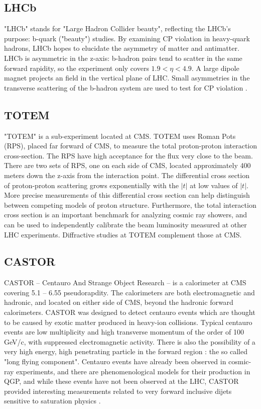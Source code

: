 \subsection{LHCb}

"LHCb" stands for "Large Hadron Collider beauty", reflecting the LHCb's purpose: b-quark ("beauty") studies. By examining CP violation in heavy-quark hadrons, LHCb hopes to elucidate the asymmetry of matter and antimatter. LHCb is asymmetric in the z-axis: b-hadron pairs tend to scatter in the same forward rapidity, so the experiment only covers $1.9<\eta<4.9$. A large dipole magnet projects an field in the vertical plane of LHC. Small asymmetries in the transverse scattering of the b-hadron system are used to test for CP violation \cite{Alves:2008zz}. 

\subsection{TOTEM}

"TOTEM" is a sub-experiment located at CMS. TOTEM uses Roman Pots (RPS), placed far forward of CMS, to measure the total proton-proton interaction cross-section. The RPS have high acceptance for the flux very close to the beam. There are two sets of RPS, one on each side of CMS, located approximately 400 meters down the z-axis from the interaction point. The differential cross section of proton-proton scattering grows exponentially with the $|t|$ at low values of $|t|$. More precise measurements of this differential cross section can help distinguish between competing models of proton structure. Furthermore, the total interaction cross section is an important benchmark for analyzing cosmic ray showers, and can be used to independently calibrate the beam luminosity measured at other LHC experiments. Diffractive studies at TOTEM complement those at CMS.

\subsection{CASTOR}

CASTOR -- Centauro And Strange Object Research -- is a calorimeter at CMS covering 5.1 -- 6.55 pseudorapdity. The calorimeters are both electromagnetic and hadronic, and located on either side of CMS, beyond the hadronic forward calorimeters. CASTOR was designed to detect centauro events which are thought to be caused by exotic matter produced in heavy-ion collisions. Typical centauro events are low multiplicity and high transverse momentum of the order of 100 GeV/c, with suppressed electromagnetic activity. There is also the possibility of a very high energy, high penetrating particle in the forward region : the so called "long flying component". Centauro events have already been observed in cosmic-ray experiments, and there are phenomenological models for their production in QGP, and while these events have not been observed at the LHC, CASTOR provided interesting measurements related to very forward inclusive dijets sensitive to saturation physics \cite{Andreev:2010zzb}.

